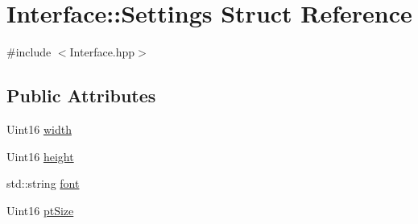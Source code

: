 \hypertarget{structInterface_1_1Settings}{\section{Interface\-:\-:Settings Struct Reference}
\label{structInterface_1_1Settings}
}


{\ttfamily \#include $<$Interface.\-hpp$>$}

\subsection*{Public Attributes}
\begin{DoxyCompactItemize}
\item 
Uint16 \hyperlink{structInterface_1_1Settings_aa98d45f64620684fe538305a40f8a7d7}{width}
\item 
Uint16 \hyperlink{structInterface_1_1Settings_a922dfb8793d733f02b1245867c2d3085}{height}
\item 
std\-::string \hyperlink{structInterface_1_1Settings_a87fdab4dc452a1c560ee51216fb521e9}{font}
\item 
Uint16 \hyperlink{structInterface_1_1Settings_a49df66cdf0a0a5f4770c7ba1163a74d2}{pt\-Size}
\end{DoxyCompactItemize}


